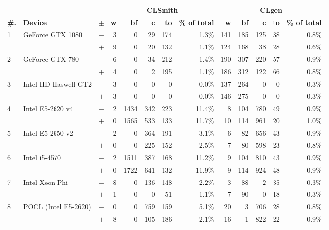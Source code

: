   \begin{tabular}{lll | rrrrr | rrrrr }
  \toprule
  & & & \multicolumn{5}{c|}{\textbf{CLSmith}} & \multicolumn{5}{c}{\textbf{CLgen}} \\
  \textbf{\#.} & \textbf{Device} & $\pm$ &
  \textbf{w} & \textbf{bf} & \textbf{c} & \textbf{to} & \textbf{\% of total} &
  \textbf{w} & \textbf{bf} & \textbf{c} & \textbf{to} & \textbf{\% of total} \\
  \midrule
  \multirow{ 2}{*}{1} & \multirow{ 2}{*}{GeForce GTX 1080} & $-$ & 3 & 0 & 29 & 174 & 1.3\%       & 141 & 185 & 125 & 38 & 0.8\% \\& & $+$ & 9 & 0 & 20 & 132 & 1.1\% & 124 & 168 & 38 & 28 & 0.6\% \\
\hline
\multirow{ 2}{*}{2} & \multirow{ 2}{*}{GeForce GTX 780} & $-$ & 6 & 0 & 34 & 212 & 1.4\%       & 190 & 307 & 220 & 57 & 0.9\% \\& & $+$ & 4 & 0 & 2 & 195 & 1.1\% & 186 & 312 & 122 & 66 & 0.8\% \\
\hline
\multirow{ 2}{*}{3} & \multirow{ 2}{*}{Intel HD Haswell GT2} & $-$ & 3 & 0 & 0 & 0 & 0.0\%       & 137 & 264 & 0 & 0 & 0.3\% \\& & $+$ & 3 & 0 & 0 & 0 & 0.0\% & 146 & 275 & 0 & 0 & 0.3\% \\
\hline
\multirow{ 2}{*}{4} & \multirow{ 2}{*}{Intel E5-2620 v4} & $-$ & 2 & 1434 & 342 & 223 & 11.4\%       & 8 & 104 & 780 & 49 & 0.9\% \\& & $+$ & 0 & 1565 & 533 & 133 & 11.7\% & 10 & 114 & 961 & 20 & 1.0\% \\
\hline
\multirow{ 2}{*}{5} & \multirow{ 2}{*}{Intel E5-2650 v2} & $-$ & 2 & 0 & 364 & 191 & 3.1\%       & 6 & 82 & 656 & 43 & 0.9\% \\& & $+$ & 0 & 0 & 225 & 152 & 2.5\% & 7 & 80 & 598 & 23 & 0.8\% \\
\hline
\multirow{ 2}{*}{6} & \multirow{ 2}{*}{Intel i5-4570} & $-$ & 2 & 1511 & 387 & 168 & 11.2\%       & 9 & 104 & 810 & 43 & 0.9\% \\& & $+$ & 0 & 1722 & 641 & 132 & 11.9\% & 9 & 114 & 924 & 48 & 0.9\% \\
\hline
\multirow{ 2}{*}{7} & \multirow{ 2}{*}{Intel Xeon Phi} & $-$ & 8 & 0 & 136 & 148 & 2.2\%       & 3 & 88 & 2 & 35 & 0.3\% \\& & $+$ & 1 & 0 & 0 & 51 & 1.1\% & 7 & 90 & 0 & 18 & 0.3\% \\
\hline
\multirow{ 2}{*}{8} & \multirow{ 2}{*}{POCL (Intel E5-2620)} & $-$ & 0 & 0 & 759 & 159 & 5.1\%       & 20 & 3 & 706 & 28 & 0.8\% \\& & $+$ & 8 & 0 & 105 & 186 & 2.1\% & 16 & 1 & 822 & 22 & 0.9\% \\

\end{tabular}
